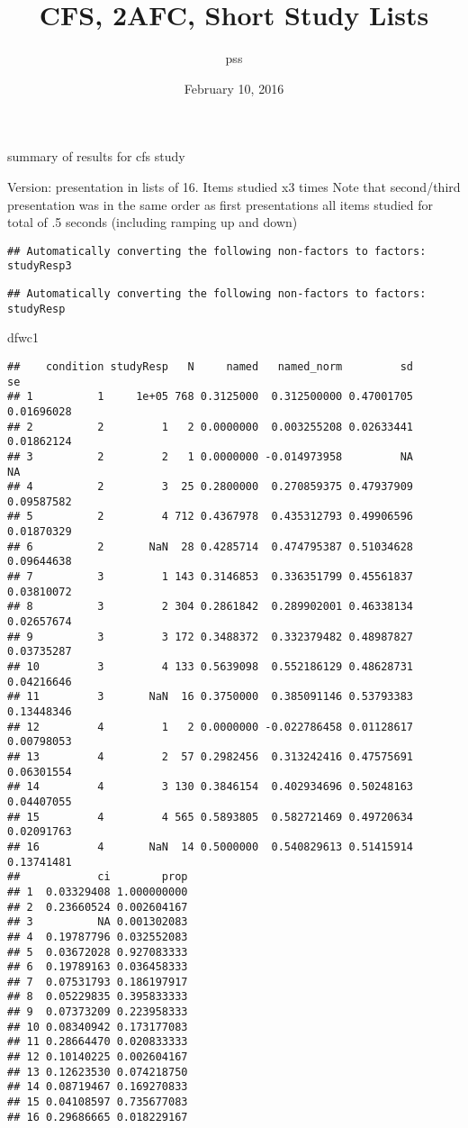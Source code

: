 \documentclass[]{article}
\title{CFS, 2AFC, Short Study Lists}
\author{pss}
\date{February 10, 2016}
\newenvironment{Shaded}{\begin{snugshade}}{\end{snugshade}}
\newcommand{\NormalTok}[1]{{#1}}
\begin{document}
\maketitle


summary of results for cfs study

Version: presentation in lists of 16. Items studied x3 times Note that
second/third presentation was in the same order as first presentations
all items studied for total of .5 seconds (including ramping up and
down)

\begin{verbatim}
## Automatically converting the following non-factors to factors: studyResp3
\end{verbatim}

\begin{verbatim}
## Automatically converting the following non-factors to factors: studyResp
\end{verbatim}

\begin{Shaded}
\begin{Highlighting}[]
\NormalTok{dfwc1}
\end{Highlighting}
\end{Shaded}

\begin{verbatim}
##    condition studyResp   N     named   named_norm         sd         se
## 1          1     1e+05 768 0.3125000  0.312500000 0.47001705 0.01696028
## 2          2         1   2 0.0000000  0.003255208 0.02633441 0.01862124
## 3          2         2   1 0.0000000 -0.014973958         NA         NA
## 4          2         3  25 0.2800000  0.270859375 0.47937909 0.09587582
## 5          2         4 712 0.4367978  0.435312793 0.49906596 0.01870329
## 6          2       NaN  28 0.4285714  0.474795387 0.51034628 0.09644638
## 7          3         1 143 0.3146853  0.336351799 0.45561837 0.03810072
## 8          3         2 304 0.2861842  0.289902001 0.46338134 0.02657674
## 9          3         3 172 0.3488372  0.332379482 0.48987827 0.03735287
## 10         3         4 133 0.5639098  0.552186129 0.48628731 0.04216646
## 11         3       NaN  16 0.3750000  0.385091146 0.53793383 0.13448346
## 12         4         1   2 0.0000000 -0.022786458 0.01128617 0.00798053
## 13         4         2  57 0.2982456  0.313242416 0.47575691 0.06301554
## 14         4         3 130 0.3846154  0.402934696 0.50248163 0.04407055
## 15         4         4 565 0.5893805  0.582721469 0.49720634 0.02091763
## 16         4       NaN  14 0.5000000  0.540829613 0.51415914 0.13741481
##            ci        prop
## 1  0.03329408 1.000000000
## 2  0.23660524 0.002604167
## 3          NA 0.001302083
## 4  0.19787796 0.032552083
## 5  0.03672028 0.927083333
## 6  0.19789163 0.036458333
## 7  0.07531793 0.186197917
## 8  0.05229835 0.395833333
## 9  0.07373209 0.223958333
## 10 0.08340942 0.173177083
## 11 0.28664470 0.020833333
## 12 0.10140225 0.002604167
## 13 0.12623530 0.074218750
## 14 0.08719467 0.169270833
## 15 0.04108597 0.735677083
## 16 0.29686665 0.018229167
\end{verbatim}
\end{document}
